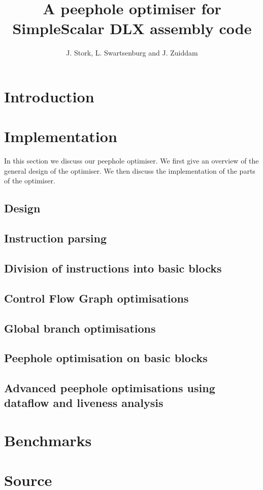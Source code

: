 \documentclass{scrreprt}
\title{A peephole optimiser for SimpleScalar DLX assembly code}
\author{J. Stork, L. Swartsenburg and J. Zuiddam}
\begin{document}
\maketitle

\tableofcontents

\chapter{Introduction}
\label{sec:introduction}



\chapter{Implementation}
In this section we discuss our peephole optimiser. We first give an overview of the general design of the optimiser. We then discuss the implementation of the parts of the optimiser.
\section{Design}
\label{sec:design}


\section{Instruction parsing}
\label{sec:parsing}


\section{Division of instructions into basic blocks}
\label{sec:splitting}


\section{Control Flow Graph optimisations}
\label{sec:graph}


\section{Global branch optimisations}
\label{sec:global}


\section{Peephole optimisation on basic blocks}
\label{sec:peephole}


\section{Advanced peephole optimisations using dataflow and liveness analysis}
\label{sec:advanced}



\chapter{Benchmarks}
\label{sec:benchmarks}



\appendix
\chapter{Source}
\label{ch:source}

\end{document}
